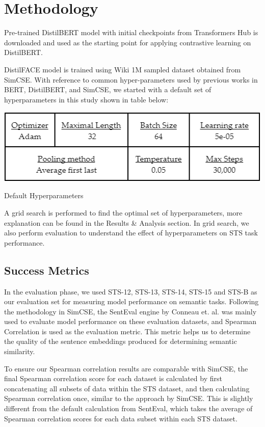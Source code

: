 \documentclass[10pt,twocolumn,letterpaper]{article}
\begin{document}
\section{Methodology}

Pre-trained DistilBERT model with initial checkpoints from Transformers Hub is downloaded and used as the starting point for applying contrastive learning on DistilBERT.

DistilFACE model is trained using Wiki 1M sampled dataset obtained from SimCSE. With reference to common hyper-parameters used by previous works in BERT, DistilBERT, and SimCSE, we started with a default set of hyperparameters in this study shown in table below:

\begin{table}[hbt!]
\centering
\includegraphics[scale=0.57]{images/Default-Hyperparameters.png}
\caption{Default Hyperparameters}
\label{fig:short}
\end{table}

A grid search is performed to find the optimal set of hyperparameters, more explanation can be found in the Results \& Analysis section. In grid search, we also perform evaluation to understand the effect of hyperparameters on STS task performance.

\subsection{Success Metrics}

In the evaluation phase, we used STS-12, STS-13, STS-14, STS-15 and STS-B as our evaluation set for measuring model performance on semantic tasks. Following the methodology in SimCSE, the SentEval engine by Conneau et. al. \cite{1803.05449} was mainly used to evaluate model performance on these evaluation datasets, and Spearman Correlation is used as the evaluation metric. This metric helps us to determine the quality of the sentence embeddings produced for determining semantic similarity.

To ensure our Spearman correlation results are comparable with SimCSE, the final Spearman correlation score for each dataset is calculated by first concatenating all subsets of data within the STS dataset, and then calculating Spearman correlation once, similar to the approach by SimCSE. This is slightly different from the default calculation from SentEval, which takes the average of Spearman correlation scores for each data subset within each STS dataset.
\end{document}
